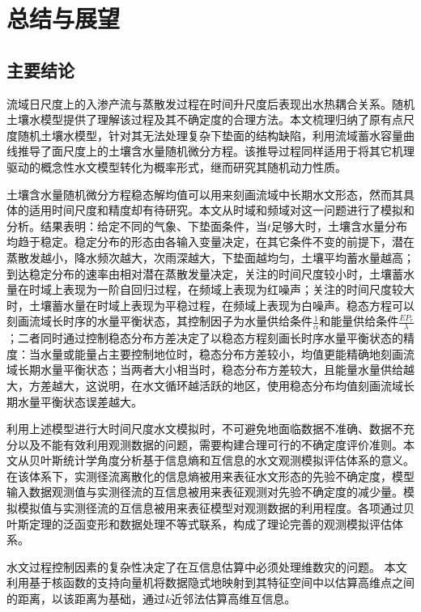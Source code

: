 

\chapter{总结与展望}
\label{cha:intro}
\section{主要结论}
流域日尺度上的入渗产流与蒸散发过程在时间升尺度后表现出水热耦合关系。随机土壤水模型提供了理解该过程及其不确定度的合理方法。本文梳理归纳了原有点尺度随机土壤水模型，针对其无法处理复杂下垫面的结构缺陷，利用流域蓄水容量曲线推导了面尺度上的土壤含水量随机微分方程。该推导过程同样适用于将其它机理驱动的概念性水文模型转化为概率形式，继而研究其随机动力性质。

土壤含水量随机微分方程稳态解均值可以用来刻画流域中长期水文形态，然而其具体的适用时间尺度和精度却有待研究。本文从时域和频域对这一问题进行了模拟和分析。结果表明：给定不同的气象、下垫面条件，当$t$足够大时，土壤含水量分布均趋于稳定。稳定分布的形态由各输入变量决定，在其它条件不变的前提下，潜在蒸散发越小，降水频次越大，次雨深越大，下垫面越均匀，土壤平均蓄水量越高；到达稳定分布的速率由相对潜在蒸散发量决定，关注的时间尺度较小时，土壤蓄水量在时域上表现为一阶自回归过程，在频域上表现为红噪声；关注的时间尺度较大时，土壤蓄水量在时域上表现为平稳过程，在频域上表现为白噪声。稳态方程可以刻画流域长时序的水量平衡状态，其控制因子为水量供给条件$\frac{1}{\alpha}$和能量供给条件$\frac{EP_r}{\lambda}$；二者同时通过控制稳态分布方差决定了以稳态方程刻画长时序水量平衡状态的精度：当水量或能量占主要控制地位时，稳态分布方差较小，均值更能精确地刻画流域长期水量平衡状态；当两者大小相当时，稳态分布方差较大，且能量水量供给越大，方差越大，这说明，在水文循环越活跃的地区，使用稳态分布均值刻画流域长期水量平衡状态误差越大。

利用上述模型进行大时间尺度水文模拟时，不可避免地面临数据不准确、数据不充分以及不能有效利用观测数据的问题，需要构建合理可行的不确定度评价准则。本文从贝叶斯统计学角度分析基于信息熵和互信息的水文观测模拟评估体系的意义。在该体系下，实测径流离散化的信息熵被用来表征水文形态的先验不确定度，模型输入数据观测值与实测径流的互信息被用来表征观测对先验不确定度的减少量。模拟模拟值与实测径流的互信息被用来表征模型对观测数据的利用程度。各项通过贝叶斯定理的泛函变形和数据处理不等式联系，构成了理论完善的观测模拟评估体系。

水文过程控制因素的复杂性决定了在互信息估算中必须处理维数灾的问题。 本文利用基于核函数的支持向量机将数据隐式地映射到其特征空间中以估算高维点之间的距离，以该距离为基础，通过$k$近邻法估算高维互信息。


